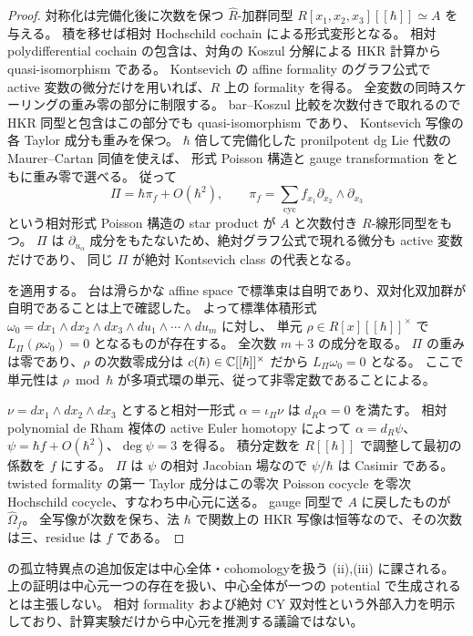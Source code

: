 \begin{proof}
対称化は完備化後に次数を保つ $\widehat R$-加群同型
$R[x_1,x_2,x_3][[\hbar]]\simeq A$ を与える。
積を移せば相対 Hochschild cochain による形式変形となる。
相対 polydifferential cochain の包含は、対角の Koszul 分解による HKR 計算から quasi-isomorphism である。
Kontsevich の affine formality のグラフ公式\cite[\S4.6, \S6]{PKontsevich}で active 変数の微分だけを用いれば、$R$ 上の formality を得る。
全変数の同時スケーリングの重み零の部分に制限する。
bar--Koszul 比較を次数付きで取れるので HKR 同型と包含はこの部分でも quasi-isomorphism であり、
Kontsevich 写像の各 Taylor 成分も重みを保つ。
$\hbar$ 倍して完備化した pronilpotent dg Lie 代数の Maurer--Cartan 同値を使えば、
形式 Poisson 構造と gauge transformation をともに重み零で選べる。
従って
\[
\Pi=\hbar\pi_f+O(\hbar^2),\qquad
\pi_f=\sum_{\mathrm{cyc}}f_{x_1}\partial_{x_2}\wedge\partial_{x_3}
\]
という相対形式 Poisson 構造の star product が $A$ と次数付き $R$-線形同型をもつ。
$\Pi$ は $\partial_{u_\alpha}$ 成分をもたないため、絶対グラフ公式で現れる微分も active 変数だけであり、
同じ $\Pi$ が絶対 Kontsevich class の代表となる。

\cite[Theorem 3, Proposition 1]{PDolgushev}を適用する。
台は滑らかな affine space で標準束は自明であり、双対化双加群が自明であることは上で確認した。
よって標準体積形式
$\omega_0=dx_1\wedge dx_2\wedge dx_3\wedge du_1\wedge\cdots\wedge du_m$ に対し、
単元 $\rho\in R[x][[\hbar]]^\times$ で $L_\Pi(\rho\omega_0)=0$ となるものが存在する。
全次数 $m+3$ の成分を取る。
$\Pi$ の重みは零であり、$\rho$ の次数零成分は $c(\hbar)\in\mathbb C[[\hbar]]^\times$ だから
$L_\Pi\omega_0=0$ となる。
ここで単元性は $\rho\bmod\hbar$ が多項式環の単元、従って非零定数であることによる。

$\nu=dx_1\wedge dx_2\wedge dx_3$ とすると相対一形式
$\alpha=\iota_\Pi\nu$ は $d_R\alpha=0$ を満たす。
相対 polynomial de Rham 複体の active Euler homotopy によって
$\alpha=d_R\psi$、$\psi=\hbar f+O(\hbar^2)$、$\deg\psi=3$ を得る。
積分定数を $R[[\hbar]]$ で調整して最初の係数を $f$ にする。
$\Pi$ は $\psi$ の相対 Jacobian 場なので $\psi/\hbar$ は Casimir である。
twisted formality の第一 Taylor 成分はこの零次 Poisson cocycle を零次 Hochschild cocycle、すなわち中心元に送る。
gauge 同型で $A$ に戻したものが $\widehat\Omega_f$。
全写像が次数を保ち、法 $\hbar$ で関数上の HKR 写像は恒等なので、その次数は三、residue は $f$ である。
\end{proof}
\begin{remark}
\cite[Proposition 8.1.1]{EG}の孤立特異点の追加仮定は中心全体・cohomologyを扱う (ii),(iii) に課される。
上の証明は中心元一つの存在を扱い、中心全体が一つの potential で生成されるとは主張しない。
相対 formality および絶対 CY 双対性という外部入力を明示しており、計算実験だけから中心元を推測する議論ではない。
\end{remark}


